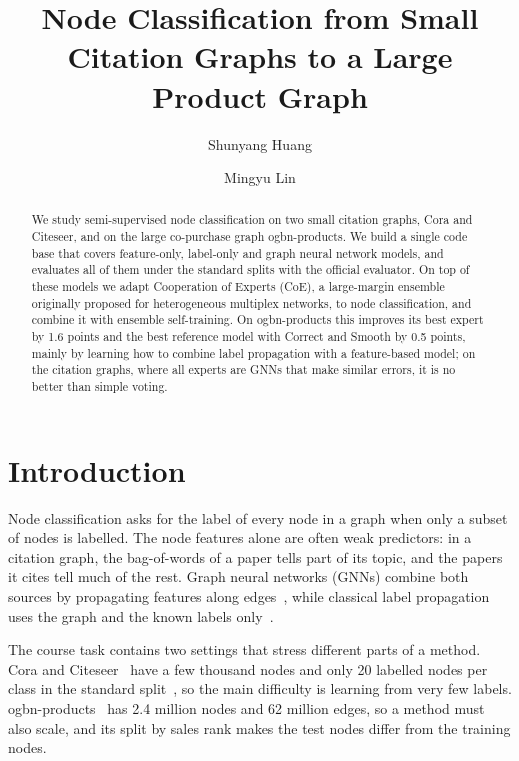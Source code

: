\documentclass[sigconf,nonacm]{acmart}
\begin{document}
\title{Node Classification from Small Citation Graphs to a Large Product Graph}

\author{Shunyang Huang}
\author{Mingyu Lin}

\begin{abstract}
We study semi-supervised node classification on two small citation graphs, Cora and Citeseer, and on the large co-purchase graph ogbn-products.
We build a single code base that covers feature-only, label-only and graph neural network models, and evaluates all of them under the standard splits with the official evaluator.
On top of these models we adapt Cooperation of Experts (CoE), a large-margin ensemble originally proposed for heterogeneous multiplex networks, to node classification, and combine it with ensemble self-training.
On ogbn-products this improves its best expert by 1.6 points and the best reference model with Correct and Smooth by 0.5 points, mainly by learning how to combine label propagation with a feature-based model; on the citation graphs, where all experts are GNNs that make similar errors, it is no better than simple voting.
\end{abstract}

\maketitle

\section{Introduction}

Node classification asks for the label of every node in a graph when only a subset of nodes is labelled.
The node features alone are often weak predictors: in a citation graph, the bag-of-words of a paper tells part of its topic, and the papers it cites tell much of the rest.
Graph neural networks (GNNs) combine both sources by propagating features along edges~\cite{kipf2017gcn,velickovic2018gat,gasteiger2019appnp,hamilton2017sage}, while classical label propagation uses the graph and the known labels only~\cite{zhu2002lp,zhou2004lgc}.

The course task contains two settings that stress different parts of a method.
Cora and Citeseer~\cite{sen2008collective} have a few thousand nodes and only 20 labelled nodes per class in the standard split~\cite{yang2016planetoid}, so the main difficulty is learning from very few labels.
ogbn-products~\cite{hu2020ogb} has 2.4 million nodes and 62 million edges, so a method must also scale, and its split by sales rank makes the test nodes differ from the training nodes.
\end{document}
